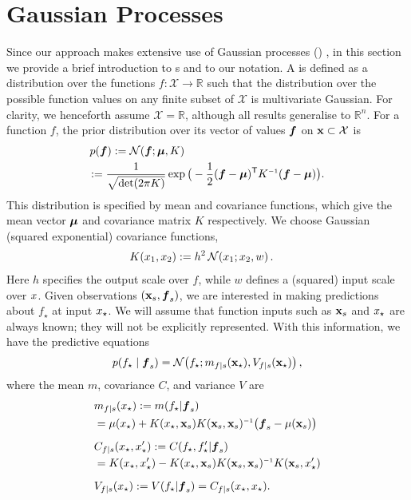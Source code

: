 \documentclass[twoside]{article}
\begin{document}
\section{Gaussian Processes}
Since our  approach makes extensive use of Gaussian processes (\gp) \cite{GPsBook}, in this section we provide a brief introduction to \gp s and to our notation. A \gpb is defined as a distribution over the functions $f: \mathcal{X} \rightarrow \mathbb{R}$ such that the distribution over the possible function values on any finite subset of $\mathcal{X}$ is multivariate Gaussian. For clarity, we henceforth assume $\mathcal{X} = \mathbb{R}$, although all results generalise to $\mathbb{R}^n$. For a function $f$, the prior distribution over its vector of values $\vf$ on $\vlfv \subset \mathcal{X}$ is
\begin{align}%
&\po{\vf}  \deq \N{\vf}{\vmu}{K}\nonumber\\
&\!\deq\frac{1}{\sqrt{\det({2\pi K})}}\exp \big(-\frac{1}{2}(\vf-\vmu)\tra K\inv(\vf-\vmu)\big).
\end{align}
This distribution is specified by mean and covariance functions, which give the mean vector $\vmu$ and covariance matrix $K$ respectively. 
We choose Gaussian (squared exponential) covariance functions,
\begin{align} \label{eq:Gaussian_cov_fn}
\textstyle
K(\lfv_1,\lfv_2)& \deq h^2\,\N{\lfv_1}{\lfv_2}{w}.
\end{align} 
Here $h$ specifies the output scale over $f$, while $w$ defines a (squared) input scale over $\lfv$. 
Given observations $(\vlfv_s,\vf_s)$, we are interested in making predictions about  $f_\star$ at input $\lfv_\star$. We will assume that function inputs such as $\vlfv_s$ and $\lfv_\star$ are always known; they will not be explicitly represented. With this information, we have the predictive equations
\begin{equation}
 \pskinny{f\st}{\vf_s} = 
\bN{f\st}
{\meancond{f}{\vlfv_\star}{s}}
{\covcond{f}{\vlfv_\star}{s}}\,,
\end{equation}
where the mean $m$, covariance $C$, and variance $V$ are
\begin{align} 
& \meancond{f}{\lfv_\star}{s}
 \deq \mean{f_\star}{\vf_s} 
\nonumber\\
& = \mu(\lfv_\star)+
K(\lfv_\star,\vlfv_s)
K(\vlfv_s,\vlfv_s)\inv
\bigl(\vf_s-{\mu}(\vlfv_s)\bigr)
\label{eq:GPMean}
\\[0.2cm]
& C_{f|s}(\lfv_\star, \lfv'_\star)
 \deq C(f_\star,f'_\star|\vf_s) 
\nonumber\\
& =K(\lfv_\star,\lfv'_\star) - 
K(\lfv_\star,\vlfv_s)
K(\vlfv_s,\vlfv_s)\inv
K(\vlfv_s,\lfv'_\star)%
\\[0.2cm]
& \covcond{f}{\lfv_\star}{s}
\deq {\cov{f_\star}{\vf_s}} 
= C_{f|s}(\lfv_\star, \lfv_\star).
\end{align} 
\end{document}

